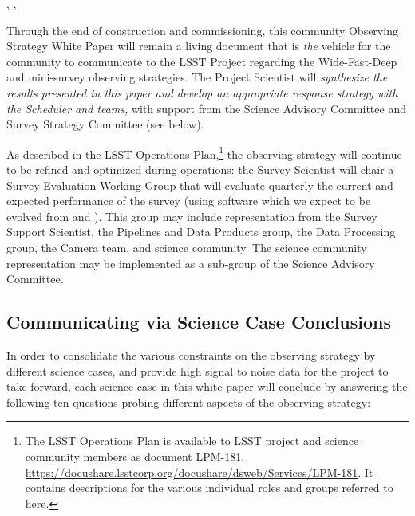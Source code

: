, , 

Through the end of construction and commissioning, this community
Observing Strategy White Paper will remain a living document that is
{\it the} vehicle for the community to communicate to the LSST Project
regarding the Wide-Fast-Deep and mini-survey observing strategies.
The Project Scientist will {\it synthesize the results presented in this paper
and develop an appropriate response strategy with the Scheduler and \OpSim
teams,} with support from the Science Advisory Committee and Survey Strategy Committee (see below).

As described in the LSST Operations Plan,\footnote{The LSST Operations Plan is available to LSST project and science community members as document LPM-181, \url{https://docushare.lsstcorp.org/docushare/dsweb/Services/LPM-181}. It contains descriptions for the various individual roles and groups referred to here.} the observing
strategy will continue to be refined and optimized during operations:
the Survey Scientist will chair a Survey Evaluation Working Group that
will evaluate quarterly the current and expected performance of the
survey (using software which we expect to be evolved from \OpSim and \MAF).
This group may include representation
from the Survey Support Scientist, the Pipelines and Data Products
group, the Data Processing group, the Camera team, and science
community.  The science community representation may be implemented as a
sub-group of the Science Advisory Committee.


\subsection{Communicating via Science Case Conclusions}
\def\secname{intro:caseConclusions}\label{sec:\secname}


In order to consolidate the various constraints on the observing
strategy by different science cases, and provide high signal to noise
data for the project to take forward, each science case in this white paper will conclude by answering the following ten
questions probing different aspects of the observing strategy:

